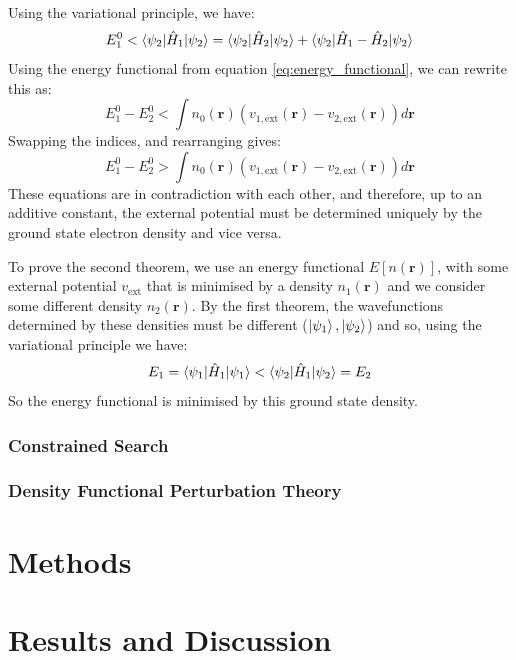\documentclass[12pt]{article}
\begin{document}
Using the variational principle, we have:
\begin{equation} 
	E^0_1 < \braket{\psi_2 | \hat H_1 | \psi_2} = \braket{\psi_2 | \hat H_2 | \psi_2} + \braket{\psi_2 |\hat H_1 - \hat H_2 |\psi_2}
\end{equation}
Using the energy functional from equation \ref{eq:energy_functional}, we can rewrite this as:
\begin{equation}\label{eq:contra_1}
E^0_1 - E^0_2 < \int n_0(\mathbf r)(v_{1,\mathrm{ext}}(\mathbf r)-v_{2,\mathrm{ext}}(\mathbf r)) d\mathbf r
\end{equation}
Swapping the indices, and rearranging gives:
\begin{equation}
E^0_1 - E^0_2 > \int n_0(\mathbf r)(v_{1,\mathrm{ext}}(\mathbf r)-v_{2,\mathrm{ext}}(\mathbf r)) d\mathbf r
\end{equation}
These equations are in contradiction with each other, and therefore, up to an additive constant, the external potential must be determined uniquely by the ground state electron density and vice versa.

To prove the second theorem, we use an energy functional $E[n(\mathbf r)]$, with some external potential $v_{\mathrm{ext}}$ that is minimised by a density $n_1(\mathbf r)$ and we consider some different density $n_2(\mathbf r)$. 
By the first theorem, the wavefunctions determined by these densities must be different ($\ket{\psi_1}, \ket{\psi_2}$) and so, using the variational principle we have:
\begin{equation}\label{eq:hk_2}
E_1 = \braket{\psi_1 | \hat H _1 | \psi_1} < \braket{\psi_2 | \hat H _1 | \psi_2} = E_2
\end{equation}
So the energy functional is minimised by this ground state density.
\subsubsection{Constrained Search}
\subsubsection{Density Functional Perturbation Theory}

\section{Methods}


\section{Results and Discussion}
\end{document}
